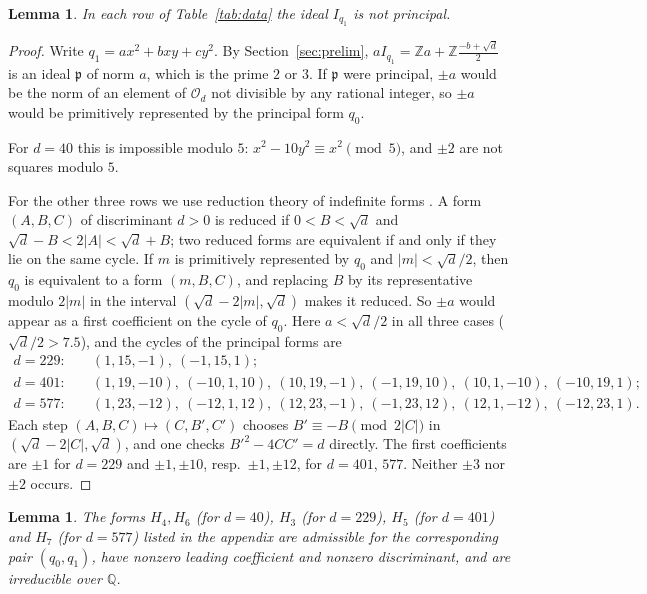 \documentclass[11pt]{amsart}
\newtheorem{lemma}[theorem]{Lemma}
\theoremstyle{definition}
\newcommand{\ZZ}{\mathbb{Z}}
\newcommand{\QQ}{\mathbb{Q}}
\newcommand{\OO}{\mathcal{O}}
\begin{document}
\begin{lemma}\label{lem:nonprincipal}
In each row of Table~\ref{tab:data} the ideal $I_{q_1}$ is not principal.
\end{lemma}

\begin{proof}
Write $q_1=ax^2+bxy+cy^2$. By Section~\ref{sec:prelim}, $aI_{q_1}=\ZZ a+\ZZ\frac{-b+\sqrt d}{2}$ is an ideal $\mathfrak p$ of norm $a$, which is the prime $2$ or $3$. If $\mathfrak p$ were principal, $\pm a$ would be the norm of an element of $\OO_d$ not divisible by any rational integer, so $\pm a$ would be primitively represented by the principal form $q_0$.

For $d=40$ this is impossible modulo $5$: $x^2-10y^2\equiv x^2\pmod5$, and $\pm2$ are not squares modulo $5$.

For the other three rows we use reduction theory of indefinite forms \cite[Chapter~3]{Bue89}. A form $(A,B,C)$ of discriminant $d>0$ is reduced if $0<B<\sqrt d$ and $\sqrt d-B<2|A|<\sqrt d+B$; two reduced forms are equivalent if and only if they lie on the same cycle. If $m$ is primitively represented by $q_0$ and $|m|<\sqrt d/2$, then $q_0$ is equivalent to a form $(m,B,C)$, and replacing $B$ by its representative modulo $2|m|$ in the interval $(\sqrt d-2|m|,\sqrt d)$ makes it reduced. So $\pm a$ would appear as a first coefficient on the cycle of $q_0$. Here $a<\sqrt d/2$ in all three cases ($\sqrt d/2>7.5$), and the cycles of the principal forms are
\begin{align*}
d=229:&\quad(1,15,-1),\ (-1,15,1);\\
d=401:&\quad(1,19,-10),\ (-10,1,10),\ (10,19,-1),\ (-1,19,10),\ (10,1,-10),\ (-10,19,1);\\
d=577:&\quad(1,23,-12),\ (-12,1,12),\ (12,23,-1),\ (-1,23,12),\ (12,1,-12),\ (-12,23,1).
\end{align*}
Each step $(A,B,C)\mapsto(C,B',C')$ chooses $B'\equiv-B\pmod{2|C|}$ in $(\sqrt d-2|C|,\sqrt d)$, and one checks $B'^2-4CC'=d$ directly. The first coefficients are $\pm1$ for $d=229$ and $\pm1,\pm10$, resp.\ $\pm1,\pm12$, for $d=401$, $577$. Neither $\pm3$ nor $\pm2$ occurs.
\end{proof}

\begin{lemma}\label{lem:base}
The forms $H_4,H_6$ (for $d=40$), $H_3$ (for $d=229$), $H_5$ (for $d=401$) and $H_7$ (for $d=577$) listed in the appendix are admissible for the corresponding pair $(q_0,q_1)$, have nonzero leading coefficient and nonzero discriminant, and are irreducible over $\QQ$.
\end{lemma}
\end{document}
